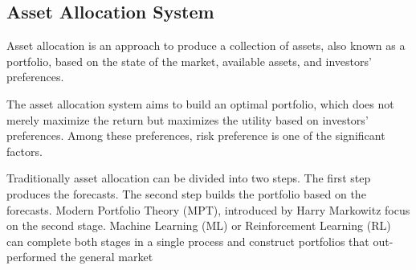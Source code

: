 \subsection {Asset Allocation System}
Asset allocation is an approach to produce a collection of assets, also known as a portfolio, based on the state of the market, available assets, and investors' preferences.

The asset allocation system aims to build an optimal portfolio, which does not merely maximize the return but maximizes the utility based on investors' preferences. Among these preferences, risk preference is one of the significant factors.

Traditionally asset allocation can be divided into two steps. The first step produces the forecasts. The second step builds the portfolio based on the forecasts.  Modern Portfolio Theory (MPT), introduced by  Harry Markowitz \cite{10.2307/2975974} focus on the second stage. Machine Learning (ML) or Reinforcement Learning (RL) can complete both stages in a single process and construct portfolios that out-performed the general market\cite{KRAUSS2017689, 935097}
